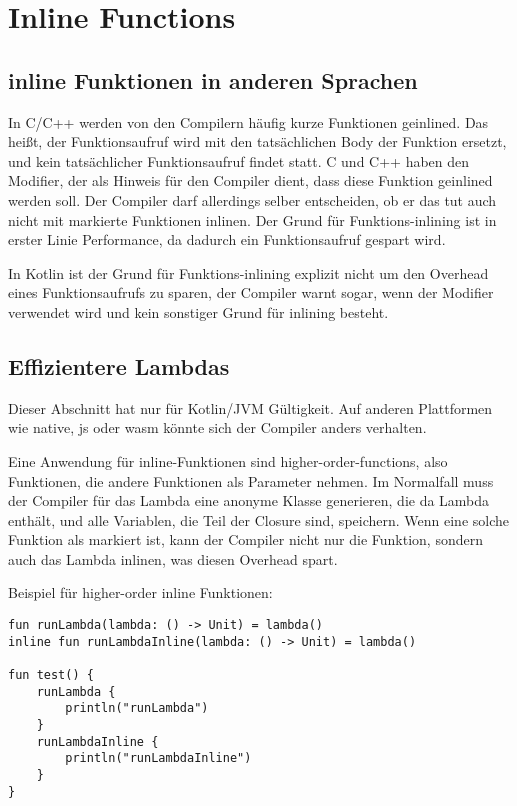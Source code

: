 
\section{Inline Functions}\label{sec:inline-functions}

\renewcommand{\kapitelautor}{Autor: Marvin Kurka}

\subsection{inline Funktionen in anderen Sprachen}
In C/C++ werden von den Compilern häufig kurze Funktionen geinlined.
Das heißt, der Funktionsaufruf wird mit den tatsächlichen Body der Funktion ersetzt, und kein tatsächlicher
Funktionsaufruf findet statt.
C und C++ haben den  Modifier, der als Hinweis für den Compiler dient, dass diese Funktion
geinlined werden soll.
Der Compiler darf allerdings selber entscheiden, ob er das tut \bzw auch nicht mit  markierte
Funktionen inlinen.
Der Grund für Funktions-inlining ist in erster Linie Performance, da dadurch ein Funktionsaufruf gespart wird.\cite{crefInline}

In Kotlin ist der Grund für Funktions-inlining explizit nicht um den Overhead eines Funktionsaufrufs zu sparen,
der Compiler warnt sogar, wenn der  Modifier verwendet wird und kein sonstiger Grund für
inlining besteht.\cite{kdocInline}

\subsection{Effizientere Lambdas}
Dieser Abschnitt hat nur für Kotlin/JVM Gültigkeit.
Auf anderen Plattformen wie native, js oder wasm könnte sich der Compiler anders verhalten.

Eine Anwendung für inline-Funktionen sind higher-order-functions, also Funktionen, die andere Funktionen als Parameter
nehmen.
Im Normalfall muss der Compiler für das Lambda eine anonyme Klasse generieren, die da Lambda enthält, und alle Variablen,
die Teil der Closure sind, speichern.
Wenn eine solche Funktion als  markiert ist, kann der Compiler nicht nur die Funktion, sondern auch
das Lambda inlinen, was diesen Overhead spart.\cite{kdocInline}

Beispiel für higher-order inline Funktionen:

\begin{verbatim}
fun runLambda(lambda: () -> Unit) = lambda()
inline fun runLambdaInline(lambda: () -> Unit) = lambda()

fun test() {
    runLambda {
        println("runLambda")
    }
    runLambdaInline {
        println("runLambdaInline")
    }
}
\end{verbatim}


